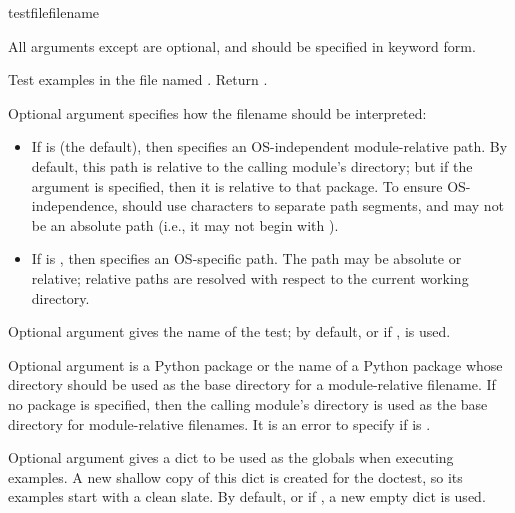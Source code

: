 \begin{funcdesc}{testfile}{filename}

  All arguments except  are optional, and should be
  specified in keyword form.

  Test examples in the file named .  Return
  .

  Optional argument  specifies how the filename
  should be interpreted:

  \begin{itemize}
  \item If  is  (the default), then
         specifies an OS-independent module-relative
        path.  By default, this path is relative to the calling
        module's directory; but if the  argument is
        specified, then it is relative to that package.  To ensure
        OS-independence,  should use \code{/} characters
        to separate path segments, and may not be an absolute path
        (i.e., it may not begin with \code{/}).
  \item If  is , then 
        specifies an OS-specific path.  The path may be absolute or
        relative; relative paths are resolved with respect to the
        current working directory.
  \end{itemize}

  Optional argument  gives the name of the test; by default,
  or if ,  is used.

  Optional argument  is a Python package or the name of a
  Python package whose directory should be used as the base directory
  for a module-relative filename.  If no package is specified, then
  the calling module's directory is used as the base directory for
  module-relative filenames.  It is an error to specify 
  if  is .

  Optional argument  gives a dict to be used as the globals
  when executing examples.  A new shallow copy of this dict is
  created for the doctest, so its examples start with a clean slate.
  By default, or if , a new empty dict is used.


\end{funcdesc}
